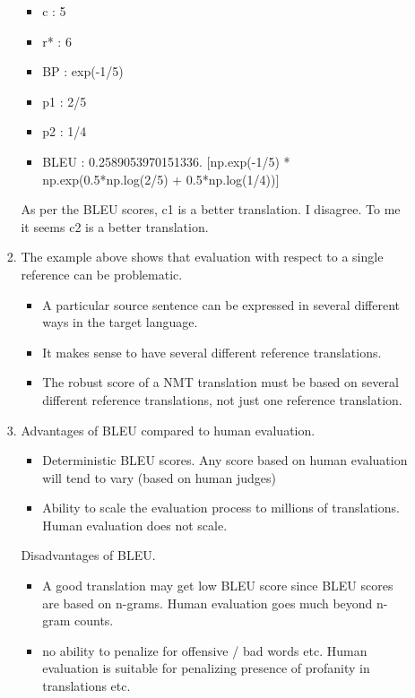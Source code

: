 \documentclass[]{article}
\begin{document}
\begin{enumerate}
\begin{enumerate}
\begin{enumerate}
					\begin{itemize}
						\item c : 5
						\item r* : 6
						\item BP : exp(-1/5)
						\item p1 : 2/5
						\item p2 : 1/4
						\item BLEU : 0.2589053970151336. [np.exp(-1/5) * np.exp(0.5*np.log(2/5) + 0.5*np.log(1/4))]

					\end{itemize}
					
					As per the BLEU scores, c1 is a better translation. I disagree.  To me it seems c2 is a better translation.
					
					\item
					
					The example above shows that evaluation with respect to a single reference can be problematic. 
					\begin{itemize}
						\item A particular source sentence can be expressed in several different ways in the target language.
						\item It makes sense to have several different reference translations. 
						\item The robust score of a NMT translation must be based on several different reference translations, not just one reference translation.
					\end{itemize}
					
					\item
					
					Advantages of BLEU compared to human evaluation.  
					\begin{itemize}
						\item Deterministic BLEU scores.  Any score based on human evaluation will tend to vary (based on human judges)
						\item Ability to scale the evaluation process to millions of translations. Human evaluation does not scale.
					\end{itemize}
					
					Disadvantages of BLEU.  
					\begin{itemize}
						\item A good translation may get low BLEU score since BLEU scores are based on n-grams. Human evaluation goes much beyond n-gram counts. 
						\item no ability to penalize for offensive / bad words etc.  Human evaluation is suitable for penalizing presence of profanity in translations etc. 
					\end{itemize}
					
				\end{enumerate}	
	\end{enumerate}
	
\end{enumerate}
\end{document}
